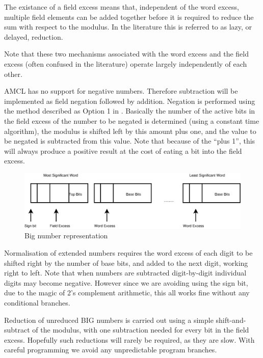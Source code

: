 \documentclass{llncs}
\begin{document}
The existance of a field excess means that, independent of the word excess, multiple field elements can be added together before it is required to reduce the sum with respect to the modulus. In the 
literature this is referred to as lazy, or delayed, reduction.

Note that these two mechanisms associated with the word excess and the field excess (often confused in the literature) operate largely independently of each other.

AMCL has no support for negative numbers. Therefore subtraction will be implemented as field negation followed by addition. Negation is performed using the method described as 
Option 1 in \cite{aranha-karabina-longa-gebotys-lopez}. Basically the 
number of the active bits in the field excess of the number to be negated is determined (using a constant time algorithm), the modulus is shifted left by this amount plus one, and the value to be negated is subtracted from this value.
Note that because of the ``plus 1'', this will always produce a positive result at the cost of eating a bit into the field excess.

\begin{figure}[!htb]
  \begin{center}
    \includegraphics[width=120mm ]{words.eps}
  \end{center}
  \caption{\small Big number representation}
  \label{words}
\end{figure}

Normalisation of extended numbers requires the word excess of each digit to be shifted right by the number of base bits, and added to the next digit, working right to left. Note that when numbers 
are subtracted digit-by-digit individual digits may become negative. However
since we are avoiding using the sign bit, due to the magic of 2's complement arithmetic, this all works fine without any conditional branches.

Reduction of unreduced {BIG} numbers is carried out using a simple shift-and-subtract of the modulus, with one subtraction needed for every bit in the field excess. 
Hopefully such reductions will rarely be required, as they are slow. With careful programming we avoid any unpredictable program branches.
\end{document}
